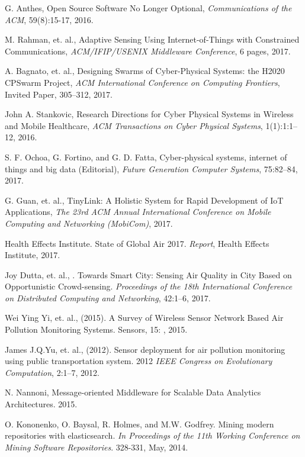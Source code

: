 \documentclass[10pt,a4paper]{report}
\begin{document}
\begin{enumerate}

 G. Anthes, Open Source Software No Longer Optional, {\it Communications of the ACM}, 59(8):15-17, 2016.

 M. Rahman, et. al., Adaptive Sensing Using Internet-of-Things with Constrained Communications, {\it ACM/IFIP/USENIX Middleware Conference}, 6 pages, 2017.

 A. Bagnato, et. al., Designing Swarms of Cyber-Physical Systems: the H2020 CPSwarm Project, 
{\it ACM International Conference on Computing Frontiers}, Invited Paper, 305--312, 2017.

 John A. Stankovic, Research Directions for Cyber Physical Systems in Wireless and Mobile Healthcare,
{\it ACM Transactions on Cyber Physical Systems}, 1(1):1:1--12, 2016.

 S. F. Ochoa, G. Fortino, and G. D. Fatta, Cyber-physical systems, internet of things and big data (Editorial), {\it Future Generation Computer Systems}, 75:82--84, 2017.

 G. Guan, et. al., TinyLink: A Holistic System for Rapid Development of IoT Applications,
{\it The 23rd ACM Annual International Conference on Mobile Computing and Networking (MobiCom)}, 2017.

 Health Effects Institute. State of Global Air 2017. {\it Report}, Health Effects Institute, 2017.

 Joy Dutta, et. al., . Towards Smart City: Sensing Air Quality in City Based on Opportunistic Crowd-sensing. {\it Proceedings of the 18th International Conference on Distributed Computing and Networking}, 42:1--6, 2017. 

 Wei Ying Yi, et. al., (2015). A Survey of Wireless Sensor Network Based Air Pollution Monitoring Systems. Sensors,  15: , 2015. 

 James J.Q.Yu, et. al., (2012). Sensor deployment for air pollution monitoring using public transportation system. 2012 {\it IEEE Congress on Evolutionary Computation}, 2:1--7, 2012.  

 N. Nannoni,  Message-oriented Middleware for Scalable Data Analytics Architectures.  2015.

O. Kononenko, O. Baysal, R. Holmes, and M.W. Godfrey. Mining modern repositories with elasticsearch. \textit{In Proceedings of the 11th Working Conference on Mining Software Repositories}. 328-331, May, 2014.


\end{enumerate}
\end{document}
